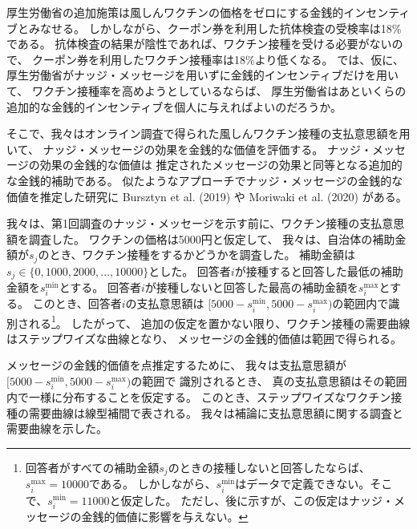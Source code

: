 \documentclass[
  11pt,
  a4paper,
]{article}
\begin{document}
厚生労働省の追加施策は風しんワクチンの価格をゼロにする金銭的インセンティブとみなせる。
しかしながら、クーポン券を利用した抗体検査の受検率は18\%である。
抗体検査の結果が陰性であれば、ワクチン接種を受ける必要がないので、
クーポン券を利用したワクチン接種率は18\%より低くなる。
では、仮に、厚生労働省がナッジ・メッセージを用いずに金銭的インセンティブだけを用いて、
ワクチン接種率を高めようとしているならば、
厚生労働省はあといくらの追加的な金銭的インセンティブを個人に与えればよいのだろうか。

そこで、我々はオンライン調査で得られた風しんワクチン接種の支払意思額を用いて、
ナッジ・メッセージの効果を金銭的な価値を評価する。
ナッジ・メッセージの効果の金銭的な価値は
推定されたメッセージの効果と同等となる追加的な金銭的補助である。
似たようなアプローチでナッジ・メッセージの金銭的な価値を推定した研究に
Bursztyn et al. (2019) や Moriwaki et al. (2020) がある。

我々は、第1回調査のナッジ・メッセージを示す前に、ワクチン接種の支払意思額を調査した。
ワクチンの価格は5000円と仮定して、
我々は、自治体の補助金額が\(s_j\)のとき、ワクチン接種をするかどうかを調査した。
補助金額は\(s_j \in \{0, 1000, 2000, \ldots, 10000\}\)とした。
回答者\(i\)が接種すると回答した最低の補助金額を\(s_i^{\text{min}}\)とする。
回答者\(i\)が接種しないと回答した最高の補助金額を\(s_i^{\text{max}}\)とする。
このとき、回答者\(i\)の支払意思額は
\([5000 - s_i^{\text{min}}, 5000 - s_i^{\text{max}})\)の範囲内で識別される\footnote{回答者がすべての補助金額\(s_j\)のときの接種しないと回答したならば、\(s_i^{\text{max}} = 10000\)である。
  しかしながら、\(s_i^{\text{min}}\)はデータで定義できない。そこで、\(s_i^{\text{min}} = 11000\)と仮定した。
  ただし、後に示すが、この仮定はナッジ・メッセージの金銭的価値に影響を与えない。}。
したがって、
追加の仮定を置かない限り、ワクチン接種の需要曲線はステップワイズな曲線となり、
メッセージの金銭的価値は範囲で得られる。

メッセージの金銭的価値を点推定するために、
我々は支払意思額が
\([5000 - s_i^{\text{min}}, 5000 - s_i^{\text{max}})\)の範囲で
識別されるとき、
真の支払意思額はその範囲内で一様に分布することを仮定する。
このとき、ステップワイズなワクチン接種の需要曲線は線型補間で表される。
我々は補論に支払意思額に関する調査と需要曲線を示した。
\end{document}
